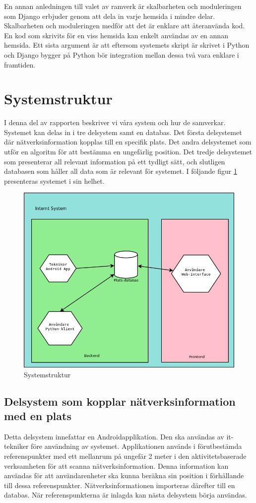 \documentclass[swedish, a4paper,12pt]{article}
\begin{document}
En annan anledningen till valet av ramverk är skalbarheten och moduleringen som Django erbjuder genom att dela in varje hemsida i mindre delar. Skalbarheten och moduleringen medför att det är enklare att återanvända kod. En kod som skrivits för en viss hemsida kan enkelt användas av en annan hemsida\cite{djangoMVC}. Ett sista argument är att eftersom systemets skript är skrivet i Python och Django bygger på Python bör integration mellan dessa två vara enklare i framtiden.

\section{Systemstruktur}
I denna del av rapporten beskriver vi våra system och hur de samverkar.
Systemet kan delas in i tre delsystem samt en databas. Det första delsystemet där nätverksinformation kopplas till en specifik plats. Det andra delsystemet som utför en algoritm för att bestämma en ungefärlig position. Det tredje delsystemet som presenterar all relevant information på ett tydligt sätt, och slutligen databasen som håller all data som är relevant för systemet.
I följande figur \ref{fig:systemStruktur} presenteras systemet i sin helhet.

\begin{figure}[H]
	\includegraphics[width=15cm]{media/systemStruktur.png}
	\caption{Systemstruktur}
	\label{fig:systemStruktur}
\end{figure}

\subsection{Delsystem som kopplar nätverksinformation med en plats}
Detta delsystem innefattar en Androidapplikation. Den ska användas av it-tekniker före användning av systemet. Applikationen används i förutbestämda referenspunkter med ett mellanrum på ungefär 2 meter i den aktivitetsbaserade verksamheten för att scanna nätverksinformation. Denna information kan användas för att användarenheter ska kunna beräkna sin position i förhållande till dessa referenspunkter. Nätverksinformationen importeras därefter till en databas. När referenspunkterna är inlagda kan nästa delsystem börja användas.
\end{document}
